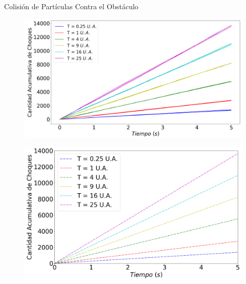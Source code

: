 \begin{frame}{Colisión de Partículas Contra el Obstáculo}

    \begin{multicols}{2}
        {
            \begin{figure}[H]
                \centering
                \includegraphics[width=1\linewidth]{pic/ejer3/b3Tiradas}
                \label{fig:ejer3:btiradas}
            \end{figure}
        }

        {
            \begin{figure}[H]
                \centering
                \includegraphics[width=1\linewidth]{pic/ejer3/bSoloSlopes}
                \label{fig:ejer3:bslopes}
            \end{figure}
        }
    \end{multicols}

\end{frame}


